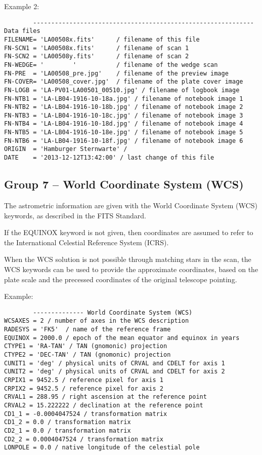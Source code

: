 \documentclass[11pt]{ivoa}
\begin{document}
Example 2:

\begin{lstlisting}
        ------------------------------------------------------------- Data files
FILENAME= 'LA00508x.fits'      / filename of this file
FN-SCN1 = 'LA00508x.fits'      / filename of scan 1
FN-SCN2 = 'LA00508y.fits'      / filename of scan 2
FN-WEDGE= '        '           / filename of the wedge scan
FN-PRE  = 'LA00508_pre.jpg'    / filename of the preview image
FN-COVER= 'LA00508_cover.jpg'  / filename of the plate cover image
FN-LOGB = 'LA-PV01-LA00501_00510.jpg' / filename of logbook image
FN-NTB1 = 'LA-LB04-1916-10-18a.jpg' / filename of notebook image 1
FN-NTB2 = 'LA-LB04-1916-10-18b.jpg' / filename of notebook image 2
FN-NTB3 = 'LA-LB04-1916-10-18c.jpg' / filename of notebook image 3
FN-NTB4 = 'LA-LB04-1916-10-18d.jpg' / filename of notebook image 4
FN-NTB5 = 'LA-LB04-1916-10-18e.jpg' / filename of notebook image 5
FN-NTB6 = 'LA-LB04-1916-10-18f.jpg' / filename of notebook image 6
ORIGIN  = 'Hamburger Sternwarte' /
DATE    = '2013-12-12T13:42:00' / last change of this file
\end{lstlisting}

\subsection{Group 7 – World Coordinate System (WCS)}

The astrometric information are given with the World Coordinate System
(WCS) keywords, as described in the FITS Standard.

If the EQUINOX keyword is not given, then coordinates are assumed to
refer to the International Celestial Reference System (ICRS).

When the WCS solution is not possible through matching stars in the
scan, the WCS keywords can be used to provide the approximate
coordinates, based on the plate scale and the precessed coordinates of
the original telescope pointing.

Example:

\begin{lstlisting}
        -------------- World Coordinate System (WCS)
WCSAXES = 2 / number of axes in the WCS description
RADESYS = 'FK5'  / name of the reference frame
EQUINOX = 2000.0 / epoch of the mean equator and equinox in years
CTYPE1 = 'RA-TAN' / TAN (gnomonic) projection
CTYPE2 = 'DEC-TAN' / TAN (gnomonic) projection
CUNIT1 = 'deg' / physical units of CRVAL and CDELT for axis 1
CUNIT2 = 'deg' / physical units of CRVAL and CDELT for axis 2
CRPIX1 = 9452.5 / reference pixel for axis 1
CRPIX2 = 9452.5 / reference pixel for axis 2
CRVAL1 = 288.95 / right ascension at the reference point
CRVAL2 = 15.222222 / declination at the reference point
CD1_1 = -0.0004047524 / transformation matrix
CD1_2 = 0.0 / transformation matrix
CD2_1 = 0.0 / transformation matrix
CD2_2 = 0.0004047524 / transformation matrix
LONPOLE = 0.0 / native longitude of the celestial pole
\end{lstlisting}
\end{document}
